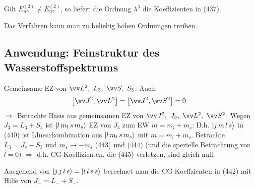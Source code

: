 \documentclass[a4paper]{scrartcl}
\begin{document}
Gilt $E_{n \gamma}^{(2)} \neq E_{n \gamma}^{(2)}$, so liefert die Ordnung $\lambda^3$ die Koeffizienten in (437).

Das Verfahren kann man zu beliebig hohen Ordnungen treiben.

\subsection{Anwendung: Feinstruktur des Wasserstoffspektrums}

\setcounter{equation}{287}
\setcounter{equation}{438}
Gemeinsame EZ von $\vv L^2, \ L_3, \  \vv S, \ S_3$:
Auch:
$$\left[ \vv J^2 , \vv L^2 \right] = \left[ \vv J^2, \vv S^2 \right] = 0$$
$\Longrightarrow$ Betrachte Basis aus gemeinsamen EZ von $\vv J^2, \ J_3, \ \vv L^2, \ \vv S^2$:
Wegen $J_3 = L_3 + S_3$ ist $\Ket{ l \, m_l \, s \, m_s}$ EZ von $J_3$ zum EW $m=m_l + m_s$:
D.h. $\Ket{ j \, m \, l \, s}$ in (440) ist LInearkombination aus $\Ket{ l \, m_l \, s \, m_s}$ mit $m = m_l + m_s$.
Betrachte $L_3 = J_s - S_3$ und $m_s \rightarrow -m_s$
(443) und (444) (und die spezielle Betrachtung von $l=0$) $\Longrightarrow$
d.h. CG-Koeffizienten, die (445) verletzen, sind gleich null.

Ausgehend von $\Ket{ j \, j \, l \, s} = \Ket{ l \, l \, s \, s}$ berechnet man die CG-Koeffzienten in (442) mit Hilfe von $J_- = L_- + S_-$.
\end{document}

